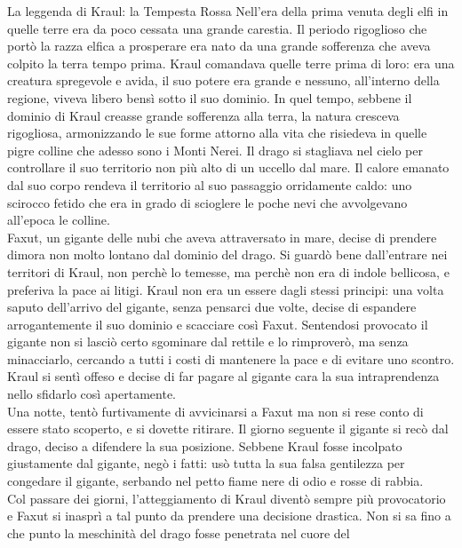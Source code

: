 \begin{commentbox}{La leggenda di Kraul: la Tempesta Rossa}
  Nell'era della prima venuta degli elfi in quelle terre era da poco cessata una grande
  carestia. Il periodo rigoglioso che port\`o la razza elfica a prosperare era nato da
  una grande sofferenza che aveva colpito la terra tempo prima.
  Kraul comandava quelle terre prima di loro:
  era una creatura spregevole e avida, il suo potere era grande e nessuno,
  all'interno della regione, viveva libero bens\`i sotto il suo dominio.
  In quel tempo, sebbene il dominio di Kraul creasse grande sofferenza alla terra,
  la natura cresceva rigogliosa, armonizzando le sue forme attorno alla vita che risiedeva
  in quelle pigre colline che adesso sono i Monti Nerei.
  Il drago si stagliava nel cielo per controllare il suo territorio non pi\`u alto di un
  uccello dal mare. Il calore emanato dal suo corpo rendeva il territorio al suo passaggio
  orridamente caldo: uno scirocco fetido che era in grado di scioglere le poche nevi che
  avvolgevano all'epoca le colline.\\
  Faxut, un gigante delle nubi che aveva attraversato in mare, decise di prendere dimora
  non molto lontano dal dominio del drago. Si guard\`o bene dall'entrare nei territori di
  Kraul, non perch\`e lo temesse, ma perch\`e non era di indole bellicosa, e preferiva la
  pace ai litigi. Kraul non era un essere dagli stessi principi: una volta saputo
  dell'arrivo del gigante, senza pensarci due volte, decise di espandere arrogantemente
  il suo dominio e scacciare cos\`i Faxut.
  Sentendosi provocato il gigante non si lasci\`o certo sgominare dal rettile e lo
  rimprover\`o, ma senza minacciarlo, cercando a tutti i costi di mantenere la pace
  e di evitare uno scontro.
  Kraul si sent\`i offeso e decise di far pagare al gigante cara la sua intraprendenza
  nello sfidarlo cos\`i apertamente.\\
  Una notte, tent\`o furtivamente di avvicinarsi
  a Faxut ma non si rese conto di essere stato scoperto, e si dovette ritirare.
  Il giorno seguente il gigante si rec\`o dal drago, deciso a difendere la sua posizione.
  Sebbene Kraul fosse incolpato giustamente dal gigante, neg\`o i fatti: us\`o tutta
  la sua falsa gentilezza per congedare il gigante, serbando nel petto fiame nere di odio e
  rosse di rabbia.\\
  Col passare dei giorni, l'atteggiamento di Kraul divent\`o sempre pi\`u
  provocatorio e Faxut si inaspr\`i a tal punto da prendere una decisione drastica.
  Non si sa fino a che punto la meschinit\`a del drago fosse penetrata nel cuore del

\end{commentbox}
